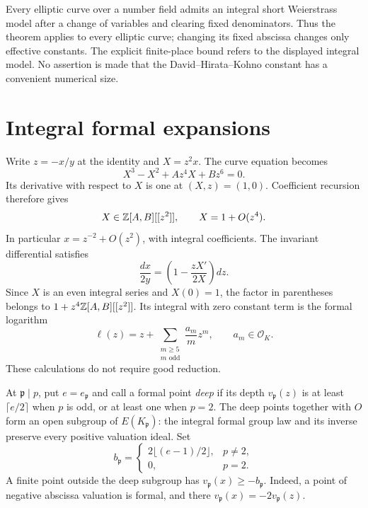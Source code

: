 \documentclass[11pt,a4paper]{article}
\newcommand{\OK}{\mathcal O_K}
\begin{document}
Every elliptic curve over a number field admits an integral short
Weierstrass model after a change of variables and clearing fixed
denominators. Thus the theorem applies to every elliptic curve;
changing its fixed abscissa changes only effective constants.
The explicit finite-place bound refers to the displayed integral
model. No assertion is made that the David--Hirata--Kohno constant
has a convenient numerical size.

\section{Integral formal expansions}
Write $z=-x/y$ at the identity and $X=z^2x$. The curve equation
becomes
\[
 X^3-X^2+Az^4X+Bz^6=0.
\]
Its derivative with respect to $X$ is one at $(X,z)=(1,0)$.
Coefficient recursion therefore gives
\[
 X\in\mathbb Z[A,B][[z^2]],\qquad X=1+O(z^4).
\]
In particular $x=z^{-2}+O(z^2)$, with integral coefficients.
The invariant differential satisfies
\[
 \frac{dx}{2y}=\left(1-\frac{zX'}{2X}\right)dz.
\]
Since $X$ is an even integral series and $X(0)=1$, the factor in
parentheses belongs to $1+z^4\mathbb Z[A,B][[z^2]]$. Its integral with
zero constant term is the formal logarithm
\[
 \ell(z)=z+\sum_{\substack{m\ge5\\m\text{ odd}}}\frac{a_m}{m}z^m,
 \qquad a_m\in\OK.
 \label{eq:log}
\]
These calculations do not require good reduction.

At $\mathfrak p\mid p$, put $e=e_{\mathfrak p}$ and call a formal
point \emph{deep} if its depth $v_{\mathfrak p}(z)$ is at least
$\lceil e/2\rceil$ when $p$ is odd, or at least one when $p=2$.
The deep points together with $O$ form an open subgroup of
$E(K_{\mathfrak p})$: the integral formal group law and its inverse
preserve every positive valuation ideal. Set
\[
 b_{\mathfrak p}=
 \begin{cases}2\lfloor(e-1)/2\rfloor,&p\ne2,\\0,&p=2.\end{cases}
\]
A finite point outside the deep subgroup has
$v_{\mathfrak p}(x)\ge-b_{\mathfrak p}$. Indeed, a point of negative
abscissa valuation is formal, and there
$v_{\mathfrak p}(x)=-2v_{\mathfrak p}(z)$.
\end{document}
